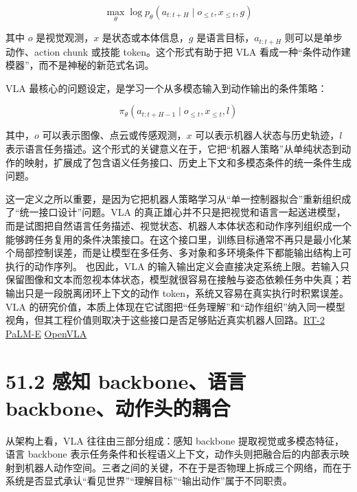 \begingroup
\footnotesize
\begin{equation*}
\max_\theta \log p_\theta(a_{t:t+H} \mid o_{\le t}, x_{\le t}, g)
\end{equation*}
\endgroup

其中 \(o\) 是视觉观测，\(x\) 是状态或本体信息，\(g\) 是语言目标，\(a_{t:t+H}\) 则可以是单步动作、action chunk 或技能 token。这个形式有助于把 VLA 看成一种“条件动作建模器”，而不是神秘的新范式名词。

VLA 最核心的问题设定，是学习一个从多模态输入到动作输出的条件策略：

\begin{equation*}
\pi_\theta(a_{t:t+H-1}\mid o_{\le t}, x_{\le t}, l)
\end{equation*}

其中，\(o\) 可以表示图像、点云或传感观测，\(x\) 可以表示机器人状态与历史轨迹，\(l\) 表示语言任务描述。这个形式的关键意义在于，它把“机器人策略”从单纯状态到动作的映射，扩展成了包含语义任务接口、历史上下文和多模态条件的统一条件生成问题。

这一定义之所以重要，是因为它把机器人策略学习从“单一控制器拟合”重新组织成了“统一接口设计”问题。VLA 的真正雄心并不只是把视觉和语言一起送进模型，而是试图把自然语言任务描述、视觉状态、机器人本体状态和动作序列组织成一个能够跨任务复用的条件决策接口。在这个接口里，训练目标通常不再只是最小化某个局部控制误差，而是让模型在多任务、多对象和多环境条件下都能输出结构上可执行的动作序列。 也因此，VLA 的输入输出定义会直接决定系统上限。若输入只保留图像和文本而忽视本体状态，模型就很容易在接触与姿态依赖任务中失真；若输出只是一段脱离闭环上下文的动作 token，系统又容易在真实执行时积累误差。VLA 的研究价值，本质上体现在它试图把“任务理解”和“动作组织”纳入同一模型视角，但其工程价值则取决于这些接口是否足够贴近真实机器人回路。\href{https://arxiv.org/abs/2307.15818}{RT-2} \href{https://arxiv.org/abs/2303.03378}{PaLM-E} \href{https://arxiv.org/abs/2406.09246}{OpenVLA}

\section*{51.2 感知 backbone、语言 backbone、动作头的耦合}


从架构上看，VLA 往往由三部分组成：感知 backbone 提取视觉或多模态特征，语言 backbone 表示任务条件和长程语义上下文，动作头则把融合后的内部表示映射到机器人动作空间。三者之间的关键，不在于是否物理上拆成三个网络，而在于系统是否显式承认“看见世界”“理解目标”“输出动作”属于不同职责。

